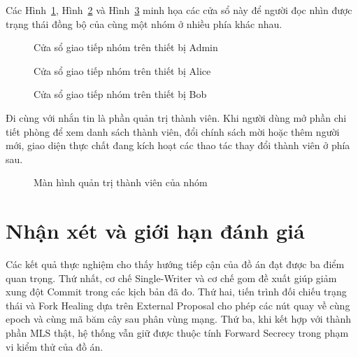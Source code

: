 \documentclass[../DoAn.tex]{subfiles}
\begin{document}
Các Hình~\ref{fig:app_chat_admin}, Hình~\ref{fig:app_chat_alice} và Hình~\ref{fig:app_chat_bob} minh họa các cửa sổ này để người đọc nhìn được trạng thái đồng bộ của cùng một nhóm ở nhiều phía khác nhau.

	\begin{figure}[htbp]
		\centering
		\caption{Cửa sổ giao tiếp nhóm trên thiết bị Admin}
		\label{fig:app_chat_admin}
	\end{figure}

	\begin{figure}[htbp]
		\centering
		\caption{Cửa sổ giao tiếp nhóm trên thiết bị Alice}
		\label{fig:app_chat_alice}
	\end{figure}

	\begin{figure}[htbp]
		\centering
		\caption{Cửa sổ giao tiếp nhóm trên thiết bị Bob}
		\label{fig:app_chat_bob}
	\end{figure}

Đi cùng với nhắn tin là phần quản trị thành viên. Khi người dùng mở phần chi tiết phòng để xem danh sách thành viên, đổi chính sách mời hoặc thêm người mới, giao diện thực chất đang kích hoạt các thao tác thay đổi thành viên ở phía sau.

	\begin{figure}[htbp]
		\centering
		\caption{Màn hình quản trị thành viên của nhóm}
		\label{fig:app_group_management}
	\end{figure}

	\section{Nhận xét và giới hạn đánh giá}
	\label{sec:nhan_xet_gioi_han}
	
Các kết quả thực nghiệm cho thấy hướng tiếp cận của đồ án đạt được ba điểm quan trọng. Thứ nhất, cơ chế Single-Writer và cơ chế gom đề xuất giúp giảm xung đột Commit trong các kịch bản đã đo. Thứ hai, tiến trình đối chiếu trạng thái và Fork Healing dựa trên External Proposal cho phép các nút quay về cùng epoch và cùng mã băm cây sau phân vùng mạng. Thứ ba, khi kết hợp với thành phần MLS thật, hệ thống vẫn giữ được thuộc tính Forward Secrecy trong phạm vi kiểm thử của đồ án.
	
\end{document}
